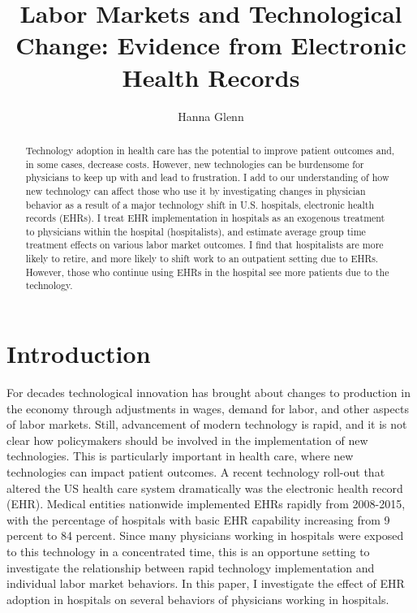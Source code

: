 \documentclass[12pt]{article}
\title{Labor Markets and Technological Change: Evidence from Electronic Health Records}
\author{Hanna Glenn}
\begin{document}
\maketitle

\begin{abstract}
    Technology adoption in health care has the potential to improve patient outcomes and, in some cases, decrease costs. However, new technologies can be burdensome for physicians to keep up with and lead to frustration. I add to our understanding of how new technology can affect those who use it by investigating changes in physician behavior as a result of a major technology shift in U.S. hospitals, electronic health records (EHRs). I treat EHR implementation in hospitals as an exogenous treatment to physicians within the hospital (hospitalists), and estimate average group time treatment effects on various labor market outcomes. I find that hospitalists are more likely to retire, and more likely to shift work to an outpatient setting due to EHRs. However, those who continue using EHRs in the hospital see more patients due to the technology. 
\end{abstract}

\vspace{1.5cm}

\section{Introduction}
For decades technological innovation has brought about changes to production in the economy through adjustments in wages, demand for labor, and other aspects of labor markets. Still, advancement of modern technology is rapid, and it is not clear how policymakers should be involved in the implementation of new technologies. This is particularly important in health care, where new technologies can impact patient outcomes. A recent technology roll-out that altered the US health care system dramatically was the electronic health record (EHR). Medical entities nationwide implemented EHRs rapidly from 2008-2015, with the percentage of hospitals with basic EHR capability increasing from 9 percent to 84 percent. Since many physicians working in hospitals were exposed to this technology in a concentrated time, this is an opportune setting to investigate the relationship between rapid technology implementation and individual labor market behaviors. In this paper, I investigate the effect of EHR adoption in hospitals on several behaviors of physicians working in hospitals. 
\end{document}
